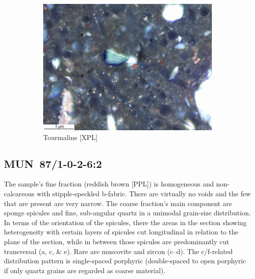 \documentclass[a4paper]{article}
\begin{document}
\begin{figure}[H]
\begin{subfigure}[t]{.32\textwidth}
		\includegraphics[width=\textwidth]{ThinSections/17-6_40x_XPL.jpg}
		\caption{Tourmaline [XPL]}
	\end{subfigure}
	\caption{}
	\label{fig:17_mun}
\end{figure}

\newpage\subsection{MUN~87/1-0-2-6:2 \citep[mun\#108; Fig.~\ref{fig:mun.pottery}.13; Ebambe style;][471 Pl.~90.1]{Seidensticker.2021e}}

\begin{multicols}{2}
\noindent The sample's fine fraction (reddish brown [PPL]) is homogeneous and non-calcareous with stipple-speckled b-fabric. There are virtually no voids and the few that are present are very narrow. The coarse fraction's main component are sponge spicules and fine, sub-angular quartz in a unimodal grain-size distribution. In terms of the orientation of the spicules, there the areas in the section showing heterogeneity with certain layers of spicules cut longitudinal in relation to the plane of the section, while in between those spicules are predominantly cut transversal (a, c, \& e). Rare are muscovite and zircon (c--d). The c/f-related distribution pattern is single-spaced porphyric (double-spaced to open porphyric if only quartz grains are regarded as coarse material).
\end{multicols}
\end{document}
